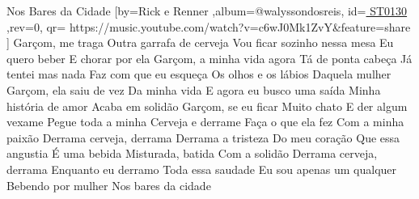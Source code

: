 \beginsong
{Nos Bares da Cidade %
}[by={Rick e Renner %
},album={@walyssondosreis},
id={\href{ https://music.youtube.com/watch?v=c6wJ0Mk1ZvY&feature=share
}{ ST0130  %
}},rev={0}, %
qr={ https://music.youtube.com/watch?v=c6wJ0Mk1ZvY&feature=share %
}]
\beginverse
Garçom, me traga
Outra garrafa de cerveja
Vou ficar sozinho nessa mesa
Eu quero beber
E chorar por ela
\endverse
\beginverse
Garçom, a minha vida agora
Tá de ponta cabeça
Já tentei mas nada
Faz com que eu esqueça
Os olhos e os lábios
Daquela mulher
\endverse
\beginverse
Garçom, ela saiu de vez
Da minha vida
E agora eu busco uma saída
Minha história de amor
Acaba em solidão
\endverse
\beginverse
Garçom, se eu ficar
Muito chato
E der algum vexame
Pegue toda a minha
Cerveja e derrame
Faça o que ela fez
Com a minha paixão
\endverse
\beginchorus
Derrama cerveja, derrama
Derrama a tristeza
Do meu coração
Que essa angustia
É uma bebida
Misturada, batida
Com a solidão
Derrama cerveja, derrama
Enquanto eu derramo
Toda essa saudade
Eu sou apenas um qualquer
Bebendo por mulher
Nos bares da cidade
\endchorus
\vspace{4em} %
\begin{comment}
\lstset{basicstyle=\scriptsize\bf} %
\tab{Solo 1}
\begin{lstlisting}
E|-----------------------------------------------------|
B|-----------------------------------------------------|
G|-----------------------------------------------------|
D|-----------------------------------------------------|
A|-----------------------------------------------------|
E|-----------------------------------------------------|
\end{lstlisting}
\end{comment}

